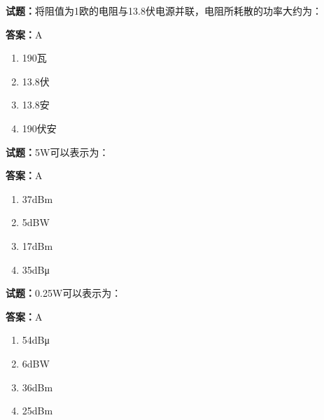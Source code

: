 \documentclass{ctexbook}
\begin{document}




\vspace{1em}

\textbf{试题：}将阻值为1欧的电阻与13.8伏电源并联，电阻所耗散的功率大约为： 

\textbf{答案：}A 

\begin{enumerate}[leftmargin=3em]
  \item 190瓦 

  \item 13.8伏 

  \item 13.8安 

  \item 190伏安 

\end{enumerate}





\vspace{1em}

\textbf{试题：}5W可以表示为： 

\textbf{答案：}A 

\begin{enumerate}[leftmargin=3em]
  \item 37dBm 

  \item 5dBW 

  \item 17dBm 

  \item 35dBμ 

\end{enumerate}






\vspace{1em}

\textbf{试题：}0.25W可以表示为： 

\textbf{答案：}A 

\begin{enumerate}[leftmargin=3em]
  \item 54dBμ 

  \item 6dBW 

  \item 36dBm 

  \item 25dBm 

\end{enumerate}
\end{document}
